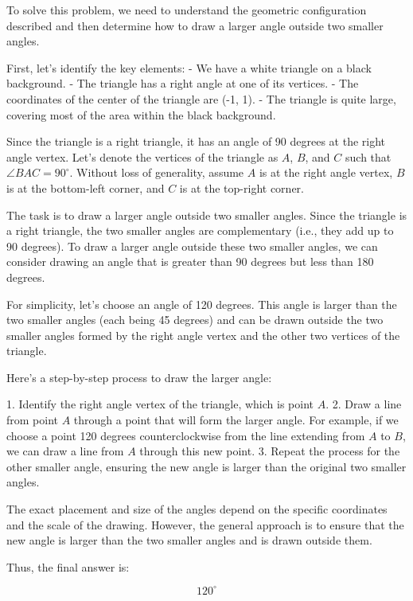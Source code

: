 To solve this problem, we need to understand the geometric configuration described and then determine how to draw a larger angle outside two smaller angles.

First, let's identify the key elements:
- We have a white triangle on a black background.
- The triangle has a right angle at one of its vertices.
- The coordinates of the center of the triangle are (-1, 1).
- The triangle is quite large, covering most of the area within the black background.

Since the triangle is a right triangle, it has an angle of 90 degrees at the right angle vertex. Let's denote the vertices of the triangle as \(A\), \(B\), and \(C\) such that \(\angle BAC = 90^\circ\). Without loss of generality, assume \(A\) is at the right angle vertex, \(B\) is at the bottom-left corner, and \(C\) is at the top-right corner.

The task is to draw a larger angle outside two smaller angles. Since the triangle is a right triangle, the two smaller angles are complementary (i.e., they add up to 90 degrees). To draw a larger angle outside these two smaller angles, we can consider drawing an angle that is greater than 90 degrees but less than 180 degrees.

For simplicity, let's choose an angle of 120 degrees. This angle is larger than the two smaller angles (each being 45 degrees) and can be drawn outside the two smaller angles formed by the right angle vertex and the other two vertices of the triangle.

Here’s a step-by-step process to draw the larger angle:

1. Identify the right angle vertex of the triangle, which is point \(A\).
2. Draw a line from point \(A\) through a point that will form the larger angle. For example, if we choose a point 120 degrees counterclockwise from the line extending from \(A\) to \(B\), we can draw a line from \(A\) through this new point.
3. Repeat the process for the other smaller angle, ensuring the new angle is larger than the original two smaller angles.

The exact placement and size of the angles depend on the specific coordinates and the scale of the drawing. However, the general approach is to ensure that the new angle is larger than the two smaller angles and is drawn outside them.

Thus, the final answer is:

\[
\boxed{120^\circ}
\]